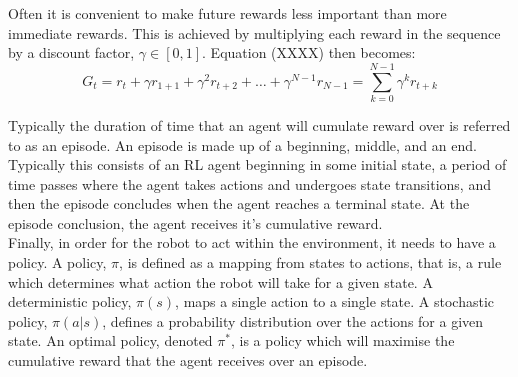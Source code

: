 \documentclass[12pt, a4paper]{article}
\begin{document}
Often it is convenient to make future rewards less important than more immediate rewards. This is achieved by multiplying each reward in the sequence by a discount factor, $\gamma \in [0,1]$. Equation (XXXX) then becomes:
\begin{equation}
G_t = r_t + \gamma r_{1+1} + \gamma^2 r_{t+2} + \ldots + \gamma^{N-1} r_{N-1} = \sum_{k = 0}^{N-1} \gamma^k r_{t+k}
\end{equation}

Typically the duration of time that an agent will cumulate reward over is referred to as an episode. An episode is made up of a beginning, middle, and an end. Typically this consists of an RL agent beginning in some initial state, a period of time passes where the agent takes actions and undergoes state transitions, and then the episode concludes when the agent reaches a terminal state. At the episode conclusion, the agent receives it's cumulative reward.\\

Finally, in order for the robot to act within the environment, it needs to have a policy. A policy, $\pi$, is defined as a mapping from states to actions, that is, a rule which determines what action the robot will take for a given state. A deterministic policy, $\pi (s)$, maps a single action to a single state. A stochastic policy, $\pi (a | s)$, defines a probability distribution over the actions for a given state. An optimal policy, denoted $\pi^*$, is a policy which will maximise the cumulative reward that the agent receives over an episode.\\
\end{document}
